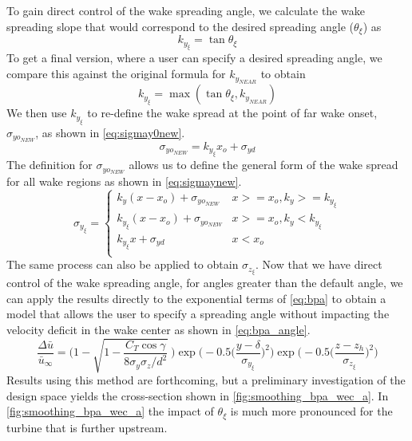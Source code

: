 \documentclass[a4paper]{jpconf}
\begin{document}
To gain direct control of the wake spreading angle, we calculate the wake spreading slope that would correspond to the desired spreading angle ($\theta_\xi$) as
%
\begin{equation}
k_{y_{\xi}} = \tan{\theta_\xi}
\end{equation}
%
To get a final version, where a user can specify a desired spreading angle, we compare this against the original formula for $k_{y_{NEAR}}$ to obtain
%
\begin{equation}
k_{y_{\xi}} = \max(\tan{\theta_\xi}, k_{y_{NEAR}})
\end{equation}
%
We then use $k_{y_{\xi}}$ to re-define the wake spread at the point of far wake onset, $\sigma_{yo_{NEW}}$, as shown in \cref{eq:sigmay0new}.
%
\begin{equation}\label{eq:sigmay0new}
\sigma_{yo_{NEW}} = k_{y_{\xi}}x_o+\sigma_{yd}
\end{equation}
%
The definition for $\sigma_{yo_{NEW}}$ allows us to define the general form of the wake spread for all wake regions as shown in \cref{eq:sigmaynew}. 
%
\begin{equation}\label{eq:sigmaynew}
\sigma_{y_{\xi}} =
\begin{cases} k_y (x-x_o)+\sigma_{yo_{NEW}} & x >= x_o, k_y >= k_{y_{\xi}} \\
k_{y_{\xi}} (x-x_o)+\sigma_{yo_{NEW}} & x >= x_o, k_y < k_{y_{\xi}} \\
k_{y_{\xi}}x+\sigma_{yd} & x < x_o \\
\end{cases}
\end{equation}
%
The same process can also be applied to obtain $\sigma_{z_{\xi}}$. Now that we have direct control of the wake spreading angle, for angles greater than the default angle, we can apply the results directly to the exponential terms of \cref{eq:bpa} to obtain  a model that allows the user to specify a spreading angle without impacting the velocity deficit in the wake center as shown in \cref{eq:bpa_angle}.
\begin{equation}
\frac{\Delta \bar{u}}{\bar{u}_{\infty}} = \Bigg(1-\sqrt{1-\frac{C_T \cos{\gamma}}{8 \sigma_y \sigma_z/d^2}}~\Bigg) \exp{\bigg(-0.5\Big(\frac{y-\delta}{\sigma_{y_{\xi}}}\Big)^2\bigg)}\exp{\bigg(-0.5\Big(\frac{z-z_h}{\sigma_{z_{\xi}}}\Big)^2\bigg)}
\label{eq:bpa_angle}
\end{equation}
%
Results using this method are forthcoming, but a preliminary investigation of the design space yields the cross-section shown in \cref{fig:smoothing_bpa_wec_a}. In \cref{fig:smoothing_bpa_wec_a} the impact of $\theta_\xi$ is much more pronounced for the turbine that is further upstream. 
\end{document}
